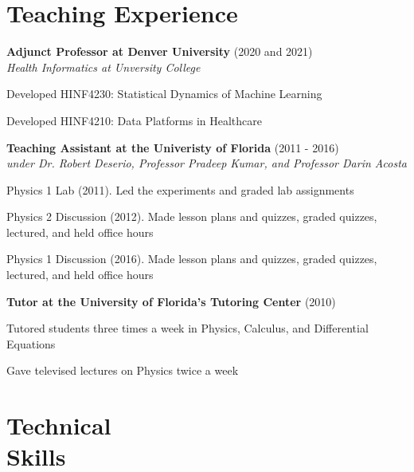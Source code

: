 \begin{resume}
    \section{\mysidestyle Teaching Experience}
    {\bf Adjunct Professor at Denver University} (2020 and 2021)\\\vspace{2mm}%
    \textit{Health Informatics at Unversity College}
    \begin{stuff}
        \vspace*{1mm}
                \item Developed HINF4230: Statistical Dynamics of Machine Learning
                \item Developed HINF4210: Data Platforms in Healthcare
    \end{stuff}
    {\bf Teaching Assistant at the Univeristy of Florida} (2011 - 2016)\\\vspace{2mm}%
    \textit{under Dr. Robert Deserio, Professor Pradeep Kumar, and Professor Darin Acosta}
    \begin{stuff}
        \vspace*{1mm}
                \item Physics 1 Lab (2011). Led the experiments and graded lab assignments
                \item Physics 2 Discussion (2012). Made lesson plans and quizzes, graded quizzes, lectured, and held office hours
                \item Physics 1 Discussion (2016). Made lesson plans and quizzes, graded quizzes, lectured, and held office hours
    \end{stuff}
    \vspace{2mm}
    {\bf Tutor at the University of Florida's Tutoring Center} (2010)\\\vspace{-2mm}%
    \begin{stuff}
        \vspace*{1mm}
                \item Tutored students three times a week in Physics, Calculus, and Differential Equations
                \item Gave televised lectures on Physics twice a week
    \end{stuff}

    \newpage
    \section{\mysidestyle Technical\\Skills}
    

\end{resume}

